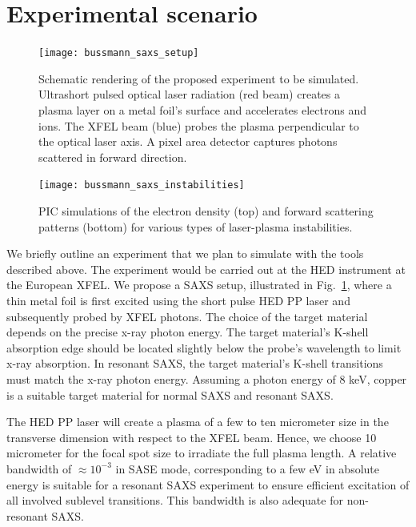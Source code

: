 \documentclass[12pt]{scrartcl}
\begin{document}
\section{Experimental scenario}
%
\begin{figure}[ht]
  \begin{center}
    \texttt{[image: bussmann\_saxs\_setup]}
  \end{center}
  \caption{Schematic rendering of the proposed experiment to be simulated.
  Ultrashort pulsed optical laser radiation (red beam) creates a plasma layer on
a metal foil's surface and accelerates electrons and ions. The XFEL beam (blue)
probes the plasma perpendicular to the optical laser axis. A pixel area detector
captures photons scattered in forward direction.}
  \label{fig:xfel-saxs_setup}
\end{figure}
%
\begin{figure}[ht]
  \begin{center}
    \texttt{[image: bussmann\_saxs\_instabilities]}
  \end{center}
  \caption{PIC simulations of the electron density (top) and forward scattering
    patterns (bottom) for various
  types of laser-plasma instabilities.}
  \label{fig:saxs_instabilities}
\end{figure}

We briefly outline an experiment that we plan to simulate with
the tools described above. The experiment would be carried out at the HED
instrument at the European XFEL. We propose a SAXS setup, illustrated in
Fig.~\ref{fig:xfel-saxs_setup}, where a thin metal foil is
first excited using the short pulse HED PP laser and subsequently probed by XFEL
photons.
The choice of the target material depends on the precise x-ray photon energy.
The target material's K-shell absorption edge should be located slightly
below the probe's wavelength to limit x-ray absorption. In resonant
SAXS, the target material's K-shell transitions must match the x-ray photon
energy. Assuming a photon energy of 8 keV, copper is a suitable target material
for normal SAXS and resonant SAXS.

The HED PP laser will
create a plasma of a few to ten micrometer size in the transverse dimension with
respect to the XFEL beam. Hence, we choose 10 micrometer for the focal spot size
to irradiate the full plasma length. A relative bandwidth of
$\approx 10^{-3}$ in SASE mode, corresponding to a few eV in absolute energy is
suitable for a resonant SAXS experiment to ensure efficient excitation of all
involved sublevel transitions. This bandwidth is also adequate for non-resonant SAXS.
\end{document}
